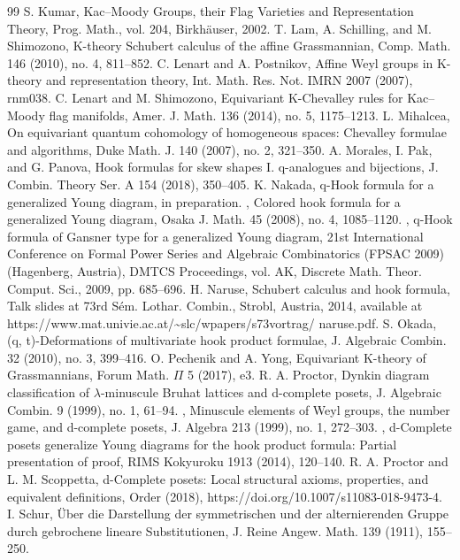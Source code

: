 \documentclass[10pt]{amsart}
\theoremstyle{definition}
\theoremstyle{remark}
\begin{document}
\begin{thebibliography}{99}
 S. Kumar, Kac–Moody Groups, their Flag Varieties and Representation Theory, Prog. Math., vol. 204, Birkhäuser, 2002.
 T. Lam, A. Schilling, and M. Shimozono, K-theory Schubert calculus of the affine Grassmannian, Comp. Math. 146 (2010), no. 4, 811–852.
 C. Lenart and A. Postnikov, Affine Weyl groups in K-theory and representation theory, Int. Math. Res. Not. IMRN 2007 (2007), rnm038.
 C. Lenart and M. Shimozono, Equivariant K-Chevalley rules for Kac–Moody flag manifolds, Amer. J. Math. 136 (2014), no. 5, 1175–1213.
 L. Mihalcea, On equivariant quantum cohomology of homogeneous spaces: Chevalley formulae and algorithms, Duke Math. J. 140 (2007), no. 2, 321–350.
 A. Morales, I. Pak, and G. Panova, Hook formulas for skew shapes I. q-analogues and bijections, J. Combin. Theory Ser. A 154 (2018), 350–405.
 K. Nakada, q-Hook formula for a generalized Young diagram, in preparation.
 , Colored hook formula for a generalized Young diagram, Osaka J. Math. 45 (2008), no. 4, 1085–1120.
 , q-Hook formula of Gansner type for a generalized Young diagram, 21st International Conference on Formal Power Series and Algebraic Combinatorics (FPSAC 2009) (Hagenberg, Austria), DMTCS Proceedings, vol. AK, Discrete Math. Theor. Comput. Sci., 2009, pp. 685–696.
 H. Naruse, Schubert calculus and hook formula, Talk slides at 73rd Sém. Lothar. Combin., Strobl, Austria, 2014, available at https://www.mat.univie.ac.at/\textasciitilde{}slc/wpapers/s73vortrag/ naruse.pdf.
 S. Okada, (q, t)-Deformations of multivariate hook product formulae, J. Algebraic Combin. 32 (2010), no. 3, 399–416.
 O. Pechenik and A. Yong, Equivariant K-theory of Grassmannians, Forum Math. $\Pi$ 5 (2017), e3.
 R. A. Proctor, Dynkin diagram classification of $\lambda$-minuscule Bruhat lattices and d-complete posets, J. Algebraic Combin. 9 (1999), no. 1, 61–94.
 , Minuscule elements of Weyl groups, the number game, and d-complete posets, J. Algebra 213 (1999), no. 1, 272–303.
 , d-Complete posets generalize Young diagrams for the hook product formula: Partial presentation of proof, RIMS Kokyuroku 1913 (2014), 120–140.
 R. A. Proctor and L. M. Scoppetta, d-Complete posets: Local structural axioms, properties, and equivalent definitions, Order (2018), https://doi.org/10.1007/s11083-018-9473-4.
 I. Schur, Über die Darstellung der symmetrischen und der alternierenden Gruppe durch gebrochene lineare Substitutionen, J. Reine Angew. Math. 139 (1911), 155–250.

\end{thebibliography}
\end{document}
